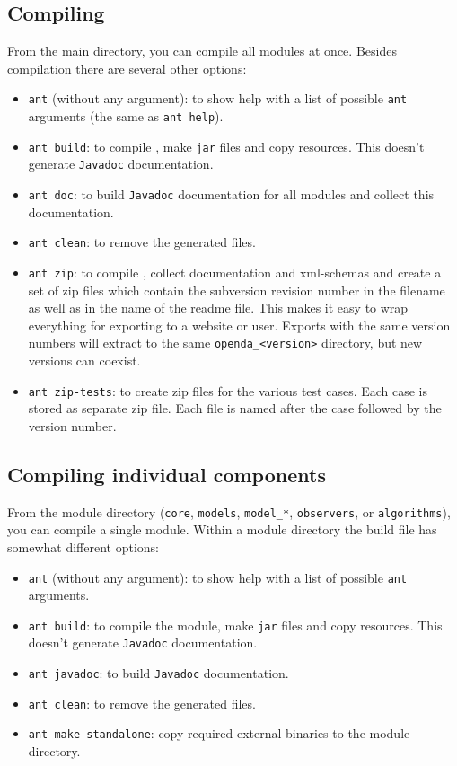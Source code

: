 \subsection{Compiling \oda}
From the \oda main directory, you can compile all modules at once. Besides compilation there are several other options:
\begin{itemize}
\item \verb|ant| (without any argument): to show help with a list of possible \verb|ant| arguments (the same as \verb|ant help|).
\item \verb|ant build|: to compile \oda, make \verb|jar| files and copy resources. This doesn't generate \verb|Javadoc| documentation.
\item \verb|ant doc|: to build \verb|Javadoc| documentation for all modules and collect this documentation.
\item \verb|ant clean|: to remove the generated files.
\item \verb|ant zip|: to compile \oda, collect documentation and xml-schemas and create a set of zip files which contain the subversion revision number in the filename as well as in the name of the readme file. This makes it easy to wrap everything for exporting to a website or user. Exports with the same version numbers will extract to the same \verb|openda_<version>| directory, but new versions can coexist.
\item \verb|ant zip-tests|: to create zip files for the various test cases. Each case is stored as separate zip file. Each file is named after the case followed by the version number.
\end{itemize}

\subsection{Compiling individual components}
From the module directory (\verb|core|, \verb|models|, \verb|model_*|, \verb|observers|, or \verb|algorithms|), you can compile a single module. Within a module directory the build file has somewhat different options:

\begin{itemize}
\item \verb|ant| (without any argument): to show help with a list of possible \verb|ant| arguments.
\item \verb|ant build|: to compile the module, make \verb|jar| files and copy resources. This doesn't generate \verb|Javadoc| documentation.
\item \verb|ant javadoc|: to build \verb|Javadoc| documentation.
\item \verb|ant clean|: to remove the generated files.
\item \verb|ant make-standalone|: copy required external binaries to the module directory.
\end{itemize}

